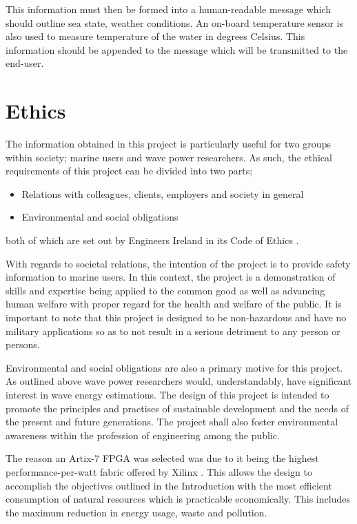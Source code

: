\documentclass[12pt,a4paper]{report} %
\begin{document}
This information must then be formed into a human-readable message which should outline sea state, weather conditions.
An on-board temperature sensor is also used to measure temperature of the water in degrees Celsius.
This information should be appended to the message which will be transmitted to the end-user.

\section{Ethics}
The information obtained in this project is particularly useful for two groups within society; marine users and wave power researchers.
As such, the ethical requirements of this project can be divided into two parts;
\begin{itemize}
\item Relations with colleagues, clients, employers and society in general
\item Environmental and social obligations
\end{itemize}
both of which are set out by Engineers Ireland in its Code of Ethics \cite{iei}.

With regards to societal relations, the intention of the project is to provide safety information to marine users.
In this context, the project is a demonstration of skills and expertise being applied to the common good as well as advancing human welfare with proper regard for the health and welfare of the public.
It is important to note that this project is designed to be non-hazardous and have no military applications so as to not result in a serious detriment to any person or persons.

Environmental and social obligations are also a primary motive for this project.
As outlined above wave power researchers would, understandably, have significant interest in wave energy estimations.
The design of this project is intended to promote the principles and practises of sustainable development and the needs of the present and future generations.
The project shall also foster environmental awareness within the profession of engineering among the public.

The reason an Artix-7 FPGA was selected was due to it being the highest performance-per-watt fabric offered by Xilinx \cite{xilinx}.
This allows the design to accomplish the objectives outlined in the Introduction with the most efficient consumption of natural resources which is practicable economically.
This includes the maximum reduction in energy usage, waste and pollution.
\end{document}
